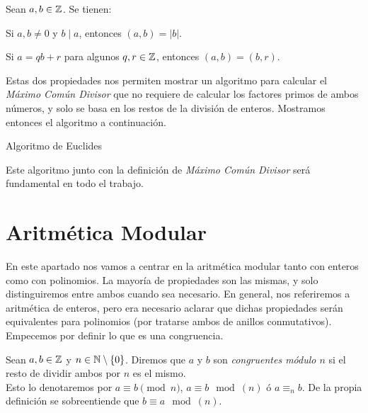 \begin{proposicion}
	Sean $a, b \in \mathbb{Z}$. Se tienen:
	
	\item Si $a, b \neq 0$ y $b \mid a$, entonces $(a, b) = |b|$.
	
	\item Si $a = qb + r$ para algunos $q, r \in \mathbb{Z}$, entonces $(a, b) = (b, r)$.
\end{proposicion}

Estas dos propiedades nos permiten mostrar un algoritmo para calcular el \textit{Máximo Común Divisor} que no requiere de calcular los factores primos de ambos números, y solo se basa en los restos de la división de enteros. Mostramos entonces el algoritmo a continuación.

\begin{algorithm}[H]
	\caption{Algoritmo de Euclides}\label{algoritmo_de_euclides}
	\begin{algorithmic}[1]
				\State {}
			\EndIf
				\State {}
			\EndIf
				\State {}
			\EndIf
			\State {}
		\EndProcedure
	\end{algorithmic}
\end{algorithm}

Este algoritmo junto con la definición de \textit{Máximo Común Divisor} será fundamental en todo el trabajo.

\section{Aritmética Modular}

En este apartado nos vamos a centrar en la aritmética modular tanto con enteros como con polinomios. La mayoría de propiedades son las mismas, y solo distinguiremos entre ambos cuando sea necesario. En general, nos referiremos a aritmética de enteros, pero era necesario aclarar que dichas propiedades serán equivalentes para polinomios (por tratarse ambos de anillos conmutativos).\\

Empecemos por definir lo que es una congruencia.

\begin{definicion}
	Sean $a, b \in \mathbb{Z}$ y $n \in \mathbb{N} \setminus \{0\}$. Diremos que $a$ y $b$ son \textit{congruentes módulo $n$} si el resto de dividir ambos por $n$ es el mismo.\\
	
	Esto lo denotaremos por $a \equiv b \pmod{n}$, $a \equiv b \mod(n)$ ó $a \equiv_n b$. De la propia definición se sobreentiende que $b \equiv a \mod(n)$.
\end{definicion}

